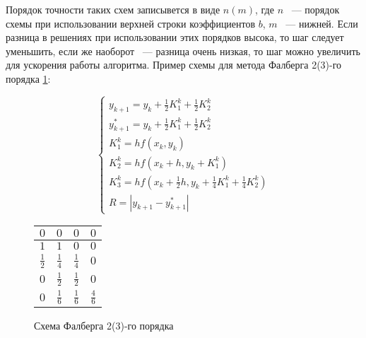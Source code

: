 Порядок точности таких схем записывется в виде $n(m)$, где $n$ ~--- порядок схемы при использовании верхней строки коэффициентов
$b$, $m$ ~--- нижней. Если разница в решениях при использовании этих порядков высока, то шаг следует уменьшить, если же наоборот ~---
разница очень низкая, то шаг можно увеличить для ускорения работы алгоритма.
Пример схемы для метода Фалберга 2(3)-го порядка \ref{fig:Falberg2}:

\begin{figure}
    \begin{minipage}[t]{8.5cm}
        {\small
        \begin{equation*}
            \begin{cases}
                y_{k + 1} = y_k + \frac{1}{2}K_1^k + \frac{1}{2}K_2^k\\
                y^{*}_{k + 1} = y_k + \frac{1}{2}K_1^k + \frac{1}{2}K_2^k\\
                K_1^k = hf(x_k, y_k)\\
                K_2^k = hf(x_k + h, y_k + K_1^k)\\
                K_3^k = hf(x_k + \frac{1}{2}h, y_k + \frac{1}{4}K_1^k + \frac{1}{4}K_2^k)\\
                R = |y_{k + 1} - y^{*}_{k + 1}|
            \end{cases}
        \end{equation*}
        }
    \end{minipage}
    \begin{minipage}[t]{7.5cm}
        \begin{table}
            \begin{tabular}{|c|c|c|c|}
            \hline
            $0$ & $0$ & $0$ & $0$\\
            \hline
            $1$ & $1$ & $0$ & $0$\\
            \hline
            $\frac{1}{2}$ & $\frac{1}{4}$ & $\frac{1}{4}$ & $0$\\
            \hline
            $0$ & \cellcolor{lightgray} $\frac{1}{2}$ & \cellcolor{lightgray} $\frac{1}{2}$ & \cellcolor{lightgray} $0$\\
            \hline
            $0$ & \cellcolor{lightgray} $\frac{1}{6}$ & \cellcolor{lightgray} $\frac{1}{6}$ & \cellcolor{lightgray} $\frac{4}{6}$\\
            \hline
            \end{tabular}
        \end{table}
    \end{minipage}
    \caption{Схема Фалберга 2(3)-го порядка}
    \label{fig:Falberg2}
\end{figure}

